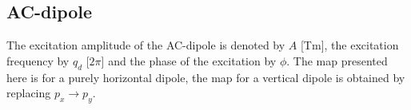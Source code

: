 %
%
%

\subsection{AC-dipole}
The excitation amplitude of the AC-dipole is denoted by $A$ [Tm], the excitation frequency by $q_d$ [$2\pi$] and the phase of the excitation by $\phi$. The map
presented here is for a purely horizontal dipole, the map for a vertical dipole is obtained by replacing $p_x\to p_y$.

